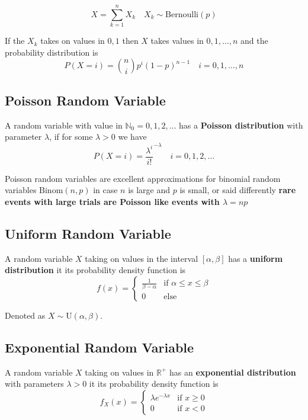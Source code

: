 \documentclass[11pt]{article}
\theoremstyle{definition}
\newcommand*\R{\mathbb{R}}
\newcommand*\N{\mathbb{N}}
\begin{document}
\begin{equation*}
	X = \sum_{k=1}^{n} X_k\quad X_k \sim \text{Bernoulli}(p)
\end{equation*}

If the $X_k$ takes on values in ${0,1}$ then $X$ takes values in ${0,1,\dots,n}$ and the probability distribution is
\begin{equation*}
	P(X=i) = \binom{n}{i} p^i(1-p)^{n-1}\quad i=0,1,\dots, n
\end{equation*}

\subsection{Poisson Random Variable}

A random variable with value in $\N_0 = {0,1,2,\dots}$ has a \textbf{Poisson distribution} with parameter $\lambda$, if for some $\lambda>0$ we have
\begin{equation*}
	P({X=i}) = \frac{\lambda^i}{i!}^{-\lambda}\quad i=0,1,2,\dots
\end{equation*}

Poisson random variables are excellent approximations for binomial random variables $\text{Binom}(n,p)$ in case $n$ is large and $p$ is small, or said differently \textbf{rare events with large trials are Poisson like events with $\lambda = np$}

\subsection{Uniform Random Variable}
A random variable $X$ taking on values in the interval $[\alpha,\beta]$ has a \textbf{uniform distribution} it its probability density function is
\begin{equation*}
	f(x) = \left\{ \begin{matrix}
	\frac{1}{\beta - \alpha}&\text{if } \alpha\leq x\leq \beta\\
	0 & \text{else}
	\end{matrix} \right.
\end{equation*}

Denoted as $X\sim \text{U}(\alpha,\beta)$.

\subsection{Exponential Random Variable}
A random variable $X$ taking on values in $\R^+$ has an \textbf{exponential distribution} with parameters $\lambda>0$ it its probability density function is
\begin{equation*}
	f_X(x) = \left\{ \begin{matrix}
	\lambda e^{-\lambda x} & \text{if } x\geq 0\\
	0 & \text{if } x< 0
	\end{matrix} \right.
\end{equation*}
\end{document}
